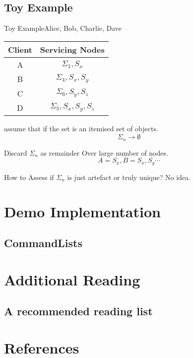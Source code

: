 \documentclass{beamer}
\begin{document}
	\subsection{Toy Example}
  \begin{frame}[t]{Toy Example}{Alice, Bob, Charlie, Dave}
    \vspace{.1cm}
    \begin{tabular}{|c|c|}
      \hline
      Client & Servicing Nodes \\
      \hline
      A & $\Sigma_{1},S_{x}$ \\
      B & $\Sigma_{4},S_{x},S_{y}$\\
      C & $\Sigma_{6},S_{y},S_{z}$\\
      D & $\Sigma_{5},S_{x},S_{y},S_{z}$\\
      \hline
    \end{tabular}
    \pause
    \begin{theorem}
      assume that if the set is  an itemised set of objects.
      \[\Sigma_{n} \to \emptyset \]

      Discard $\Sigma_{n}$ as remainder Over large number of nodes.
      \[ A = {S_{x}}, B = {S_{x},S_{y}} \cdots\]
      \pause

      How to Assess if $\Sigma_{n}$ is just artefact or truly unique? No idea.
    \end{theorem}
  \end{frame}
	\subsection{}
  \section{Demo Implementation}
  \subsection{CommandLists}
	\section{Additional Reading}
	\subsection{A recommended reading list}
	\section{References}
\end{document}
